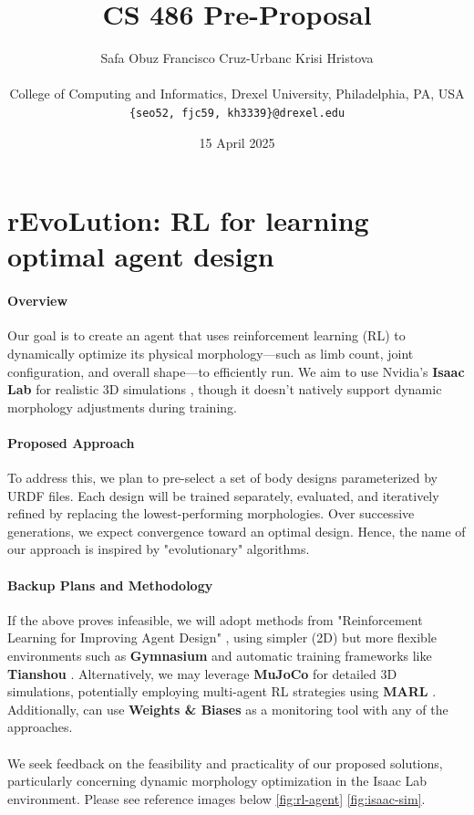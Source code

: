 \documentclass{article}
\title{CS 486 Pre-Proposal}
\author{
Safa Obuz \quad Francisco Cruz-Urbanc \quad Krisi Hristova  \\\\
College of Computing and Informatics, Drexel University, Philadelphia, PA, USA \\
{\tt\small \{seo52, fjc59, kh3339\}@drexel.edu}
}
\date{15 April 2025}
\begin{document}
\maketitle

\section*{\textcolor{lightred}{r}Evo\textcolor{lightred}{L}ution: RL for learning optimal agent design}



\paragraph{Overview} Our goal is to create an agent that uses reinforcement learning (RL) to dynamically optimize its physical morphology—such as limb count, joint configuration, and overall shape—to efficiently run. We aim to use Nvidia's \textbf{Isaac Lab} for realistic 3D simulations \cite{orbit}, though it doesn't natively support dynamic morphology adjustments during training.
\paragraph{Proposed Approach} To address this, we plan to pre-select a set of body designs parameterized by URDF files. Each design will be trained separately, evaluated, and iteratively refined by replacing the lowest-performing morphologies. Over successive generations, we expect convergence toward an optimal design. Hence, the name of our approach is inspired by "evolutionary" algorithms.
\paragraph{Backup Plans and Methodology} If the above proves infeasible, we will adopt methods from "Reinforcement Learning for Improving Agent Design" \cite{Ha2018designrl}, using simpler (2D) but more flexible environments such as \textbf{Gymnasium} \cite{gymnasium} and automatic training frameworks like \textbf{Tianshou} \cite{tianshou}. Alternatively, we may leverage \textbf{MuJoCo} \cite{mujoco} for detailed 3D simulations, potentially employing multi-agent RL strategies using \textbf{MARL} \cite{marl}. Additionally, can use \textbf{Weights \& Biases} as a monitoring tool with any of the approaches.
\\\\
We seek feedback on the feasibility and practicality of our proposed solutions, particularly concerning dynamic morphology optimization in the Isaac Lab environment. Please see reference images below \ref{fig:rl-agent} \ref{fig:isaac-sim}.
\end{document}
